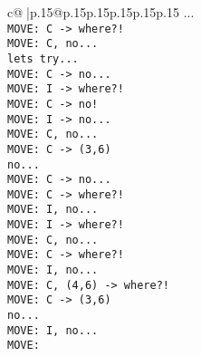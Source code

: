 \documentclass{article}
\begin{document}
{\begin{supertabular}{c@{$\;$}|p{.15\linewidth}@{}p{.15\linewidth}p{.15\linewidth}p{.15\linewidth}p{.15\linewidth}p{.15\linewidth}}
{{{...\\ \tt  MOVE: C -> where?!\\ \tt  MOVE: C, no...\\ \tt  lets try...\\ \tt  MOVE: C -> no...\\ \tt  MOVE: I -> where?!\\ \tt  MOVE: C -> no!\\ \tt  MOVE: I -> no...\\ \tt  MOVE: C, no...\\ \tt  MOVE: C -> (3,6) \\ \tt  no...\\ \tt  MOVE: C -> no...\\ \tt  MOVE: C -> where?!\\ \tt  MOVE: I, no...\\ \tt  MOVE: I -> where?!\\ \tt  MOVE: C, no...\\ \tt  MOVE: C -> where?!\\ \tt  MOVE: I, no...\\ \tt  MOVE: C, (4,6) -> where?!\\ \tt  MOVE: C -> (3,6) \\ \tt  no...\\ \tt  MOVE: I, no...\\ \tt  MOVE: }}}
\end{supertabular}}
\end{document}
